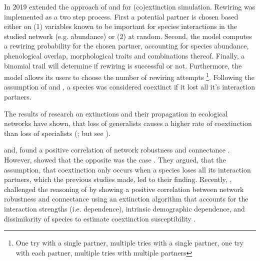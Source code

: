 \documentclass[12pt,a4paper]{article}
\begin{document}
In 2019 \citeauthor{Vizentin-Bugoni2019} extended the approach of \citeauthor{Memmott2004} and \citeauthor{Dunne2002} \parencite{Memmott2004, Dunne2002} for (co)extinction simulation.
Rewiring was implemented as a two step process. First a potential partner is chosen based either on (1) variables known to be important for species interactions in the studied network (e.g. abundance) or (2) at random. Second, the model computes a rewiring probability for the chosen partner, accounting for species abundance, phenological overlap, morphological traits and combinations thereof. Finally, a binomial trail will determine if rewiring is successful or not. Furthermore, the model allows its users to choose the number of rewiring attempts \footnote{
One try with a single partner, 
multiple tries with a single partner, 
one try with each partner, 
multiple tries with multiple partners
}. Following the assumption of \citeauthor{Memmott2004} and \citeauthor{Dunne2002}, a species was considered coextinct if it lost all it's interaction partners.
\par


The results of research on extinctions and their propagation in ecological networks have shown, that loss of generalists causes a higher rate of coextinction than loss of specialists (\cite{Memmott2004, Kaiser-Bunbury2010, Traveset2017, Bastazini2018, Vizentin-Bugoni2019, Biella2020}; but see \cite{Dunne2002}). 



\citeauthor{Dunne2002, Ekloef2006} and, \citeauthor{Thebault2010} found a positive correlation of network robustness and connectance \parencite{Dunne2002, Ekloef2006, Thebault2010}. However, \citeauthor{Vieira2015} showed that the opposite was the case \parencite{Vieira2015}. They argued, that the assumption, that coextinction only occurs when a species loses all its interaction partners, which the previous studies made, led to their finding. Recently, \citeauthor{Baumgartner2020}, challenged the reasoning of \citeauthor{Vieira2015} by showing a positive correlation between network robustness and connectance using an extinction algorithm that accounts for the interaction strengths (i.e. dependence), intrinsic demographic dependence, and dissimilarity of species to estimate coextinction susceptibility \parencite{Baumgartner2020}. 
\end{document}
